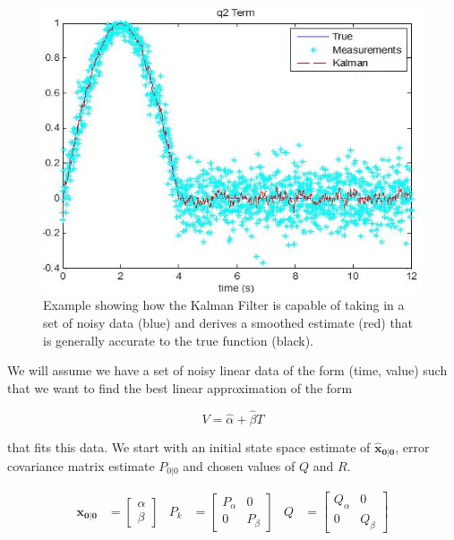 \begin{figure}[h]
\centering
\includegraphics{body/methodology/q2_kalman.jpg}
\caption{Example showing how the Kalman Filter is capable of taking in a set of noisy data (blue) and derives a smoothed estimate (red) that is generally accurate to the true function (black).}
\label{fig:kfexamp}
\end{figure}


We will assume we have a set of noisy linear data of the form (time, value) such that we want to find the best linear approximation of the form 

\begin{equation} 
V = \hat{\alpha} + \hat{\beta}T
\end{equation}

that fits this data. We start with an initial state space estimate of $\bm{\hat{x}_{0|0}}$, error covariance matrix estimate $P_{0|0}$ and chosen values of $Q$ and $R$.

\begin{subequations}
\begin{align}
    \bm{x_{0|0}} &= \begin{bmatrix}
           \alpha \\
           \beta
         \end{bmatrix}
 \end{align}
  \begin{align}
    P_{k} &= \begin{bmatrix}
           P_{\alpha}&0 \\
           0&P_{\beta}
         \end{bmatrix}
  \end{align}
  \begin{align}
    Q &= \begin{bmatrix}
        Q_{\alpha}&0 \\
        0&Q_{\beta}
        \end{bmatrix}
  \end{align}
  \end{subequations}
  
